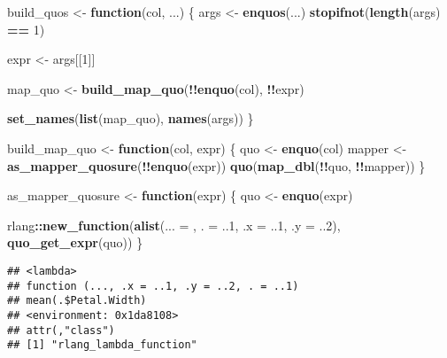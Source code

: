 \documentclass[]{book}
\newenvironment{Shaded}{\begin{snugshade}}{\end{snugshade}}
\newcommand{\ControlFlowTok}[1]{\textcolor[rgb]{0.13,0.29,0.53}{\textbf{#1}}}
\newcommand{\DataTypeTok}[1]{\textcolor[rgb]{0.13,0.29,0.53}{#1}}
\newcommand{\DecValTok}[1]{\textcolor[rgb]{0.00,0.00,0.81}{#1}}
\newcommand{\KeywordTok}[1]{\textcolor[rgb]{0.13,0.29,0.53}{\textbf{#1}}}
\newcommand{\NormalTok}[1]{#1}
\newcommand{\OperatorTok}[1]{\textcolor[rgb]{0.81,0.36,0.00}{\textbf{#1}}}
\newcommand{\StringTok}[1]{\textcolor[rgb]{0.31,0.60,0.02}{#1}}
\begin{document}
\begin{Shaded}
\begin{Highlighting}[]
\NormalTok{build_quos <-}\StringTok{ }\ControlFlowTok{function}\NormalTok{(col, ...) \{}
\NormalTok{  args <-}\StringTok{ }\KeywordTok{enquos}\NormalTok{(...)}
  \KeywordTok{stopifnot}\NormalTok{(}\KeywordTok{length}\NormalTok{(args) }\OperatorTok{==}\StringTok{ }\DecValTok{1}\NormalTok{)}

\NormalTok{  expr <-}\StringTok{ }\NormalTok{args[[}\DecValTok{1}\NormalTok{]]}

\NormalTok{  map_quo <-}\StringTok{ }\KeywordTok{build_map_quo}\NormalTok{(}\OperatorTok{!!}\KeywordTok{enquo}\NormalTok{(col), }\OperatorTok{!!}\NormalTok{expr)}

  \KeywordTok{set_names}\NormalTok{(}\KeywordTok{list}\NormalTok{(map_quo), }\KeywordTok{names}\NormalTok{(args))}
\NormalTok{\}}

\NormalTok{build_map_quo <-}\StringTok{ }\ControlFlowTok{function}\NormalTok{(col, expr) \{}
\NormalTok{  quo <-}\StringTok{ }\KeywordTok{enquo}\NormalTok{(col)}
\NormalTok{  mapper <-}\StringTok{ }\KeywordTok{as_mapper_quosure}\NormalTok{(}\OperatorTok{!!}\KeywordTok{enquo}\NormalTok{(expr))}
  \KeywordTok{quo}\NormalTok{(}\KeywordTok{map_dbl}\NormalTok{(}\OperatorTok{!!}\NormalTok{quo, }\OperatorTok{!!}\NormalTok{mapper))}
\NormalTok{\}}

\NormalTok{as_mapper_quosure <-}\StringTok{ }\ControlFlowTok{function}\NormalTok{(expr) \{}
\NormalTok{  quo <-}\StringTok{ }\KeywordTok{enquo}\NormalTok{(expr)}

\NormalTok{  rlang}\OperatorTok{::}\KeywordTok{new_function}\NormalTok{(}\KeywordTok{alist}\NormalTok{(}\DataTypeTok{... =}\NormalTok{ , }\DataTypeTok{. =}\NormalTok{ ..}\DecValTok{1}\NormalTok{, }\DataTypeTok{.x =}\NormalTok{ ..}\DecValTok{1}\NormalTok{, }\DataTypeTok{.y =}\NormalTok{ ..}\DecValTok{2}\NormalTok{), }\KeywordTok{quo_get_expr}\NormalTok{(quo))}
\NormalTok{\}}
\end{Highlighting}
\end{Shaded}

\begin{Shaded}
\end{Shaded}

\begin{verbatim}
## <lambda>
## function (..., .x = ..1, .y = ..2, . = ..1) 
## mean(.$Petal.Width)
## <environment: 0x1da8108>
## attr(,"class")
## [1] "rlang_lambda_function"
\end{verbatim}
\end{document}
